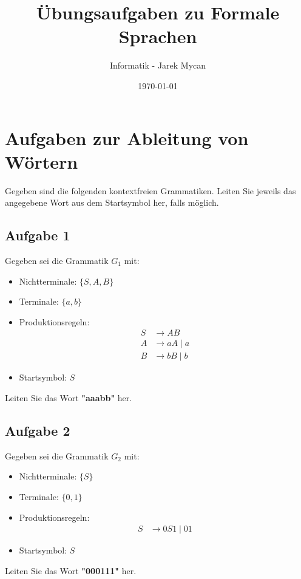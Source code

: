 \documentclass[a4paper,12pt]{article}
\begin{document}
	
	\title{Übungsaufgaben zu Formale Sprachen}
	\author{Informatik - Jarek Mycan}
	\date{\today}
	\maketitle
	
	\section*{Aufgaben zur Ableitung von Wörtern}
	
	Gegeben sind die folgenden kontextfreien Grammatiken. Leiten Sie jeweils das angegebene Wort aus dem Startsymbol her, falls möglich.
	
	\subsection*{Aufgabe 1}
	Gegeben sei die Grammatik $G_1$ mit:
	\begin{itemize}
		\item Nichtterminale: $\{S, A, B\}$
		\item Terminale: $\{a, b\}$
		\item Produktionsregeln:
		\begin{align*}
			S &\rightarrow A B \\
			A &\rightarrow a A \mid a \\
			B &\rightarrow b B \mid b
		\end{align*}
		\item Startsymbol: $S$
	\end{itemize}
	Leiten Sie das Wort \textbf{"aaabb"} her.
	
	\subsection*{Aufgabe 2}
	Gegeben sei die Grammatik $G_2$ mit:
	\begin{itemize}
		\item Nichtterminale: $\{S\}$
		\item Terminale: $\{0, 1\}$
		\item Produktionsregeln:
		\begin{align*}
			S &\rightarrow 0 S 1 \mid 01
		\end{align*}
		\item Startsymbol: $S$
	\end{itemize}
	Leiten Sie das Wort \textbf{"000111"} her.
	
\end{document}
